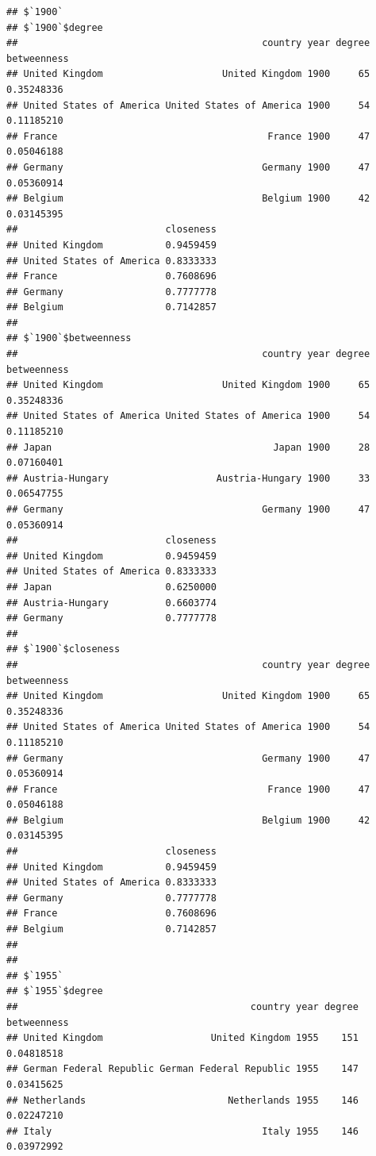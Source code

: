 \documentclass[
]{article}
\begin{document}
\begin{verbatim}
## $`1900`
## $`1900`$degree
##                                           country year degree betweenness
## United Kingdom                     United Kingdom 1900     65  0.35248336
## United States of America United States of America 1900     54  0.11185210
## France                                     France 1900     47  0.05046188
## Germany                                   Germany 1900     47  0.05360914
## Belgium                                   Belgium 1900     42  0.03145395
##                          closeness
## United Kingdom           0.9459459
## United States of America 0.8333333
## France                   0.7608696
## Germany                  0.7777778
## Belgium                  0.7142857
## 
## $`1900`$betweenness
##                                           country year degree betweenness
## United Kingdom                     United Kingdom 1900     65  0.35248336
## United States of America United States of America 1900     54  0.11185210
## Japan                                       Japan 1900     28  0.07160401
## Austria-Hungary                   Austria-Hungary 1900     33  0.06547755
## Germany                                   Germany 1900     47  0.05360914
##                          closeness
## United Kingdom           0.9459459
## United States of America 0.8333333
## Japan                    0.6250000
## Austria-Hungary          0.6603774
## Germany                  0.7777778
## 
## $`1900`$closeness
##                                           country year degree betweenness
## United Kingdom                     United Kingdom 1900     65  0.35248336
## United States of America United States of America 1900     54  0.11185210
## Germany                                   Germany 1900     47  0.05360914
## France                                     France 1900     47  0.05046188
## Belgium                                   Belgium 1900     42  0.03145395
##                          closeness
## United Kingdom           0.9459459
## United States of America 0.8333333
## Germany                  0.7777778
## France                   0.7608696
## Belgium                  0.7142857
## 
## 
## $`1955`
## $`1955`$degree
##                                         country year degree betweenness
## United Kingdom                   United Kingdom 1955    151  0.04818518
## German Federal Republic German Federal Republic 1955    147  0.03415625
## Netherlands                         Netherlands 1955    146  0.02247210
## Italy                                     Italy 1955    146  0.03972992

\end{verbatim}
\end{document}
